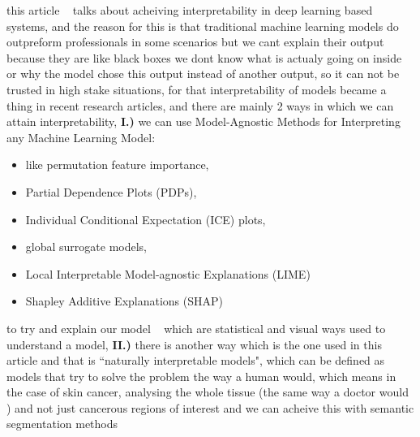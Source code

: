 this article ~\cite{Thomas2021} talks about acheiving interpretability in deep learning based systems, and the reason for this is that traditional machine learning models do outpreform professionals in some scenarios but we cant explain their output because they are like black boxes we dont know what is actualy going on inside or why the model chose this output instead of another output, so it can not be trusted in high stake situations, for that interpretability of models became a thing in recent research articles, and there are mainly 2 ways in which we can attain interpretability, \textbf{I.)} we can use Model-Agnostic Methods for Interpreting any Machine Learning Model:
\begin{itemize}
    \item like permutation feature importance, 
    \item Partial Dependence Plots (PDPs), 
    \item Individual Conditional Expectation (ICE) plots, 
    \item global surrogate models, 
    \item Local Interpretable Model-agnostic Explanations (LIME) 
    \item Shapley Additive Explanations (SHAP) 
\end{itemize}
to try and explain our model ~\cite{Hennie2020} which are statistical and visual ways used to understand a model, \textbf{II.)} there is another way which is the one used in this article and that is ``naturally interpretable models", which can be defined as models that try to solve the problem the way a human would, which means in the case of skin cancer, analysing the whole tissue (the same way a doctor would ) and not just cancerous regions of interest and we can acheive this with semantic segmentation methods

